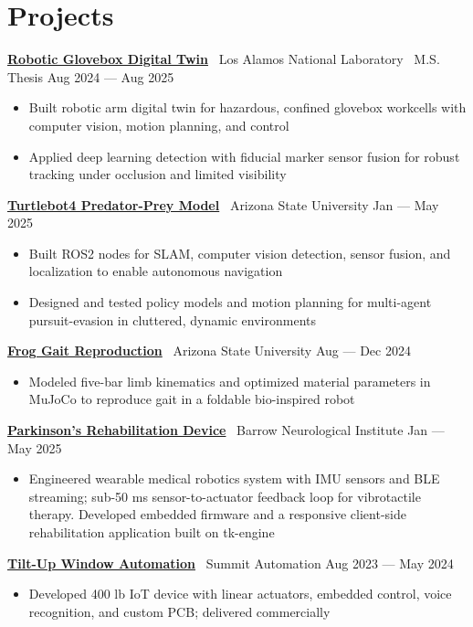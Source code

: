 \documentclass[10pt]{article}
\begin{document}
\section*{Projects}
\textbf{\href{https://github.com/MGross21/glovebox-digitaltwin}{Robotic Glovebox Digital Twin}} \textbar\ Los Alamos National Laboratory \textbar\ M.S. Thesis \hfill Aug 2024 --- Aug 2025
\begin{itemize}
  \item Built robotic arm digital twin for hazardous, confined glovebox workcells with computer vision, motion planning, and control
  \item Applied deep learning detection with fiducial marker sensor fusion for robust tracking under occlusion and limited visibility
\end{itemize}
\textbf{\href{https://ASU-RAS598-2025-S-TEAM02.github.io}{Turtlebot4 Predator-Prey Model}} \textbar\ Arizona State University \hfill Jan --- May 2025
\begin{itemize}
  \item Built ROS2 nodes for SLAM, computer vision detection, sensor fusion, and localization to enable autonomous navigation
  \item Designed and tested policy models and motion planning for multi-agent pursuit-evasion in cluttered, dynamic environments
\end{itemize}
\textbf{\href{https://github.com/MGross21/Robotic-Jumping-Frog}{Frog Gait Reproduction}} \textbar\ Arizona State University \hfill Aug --- Dec 2024
\begin{itemize}
  \item Modeled five-bar limb kinematics and optimized material parameters in MuJoCo to reproduce gait in a foldable bio-inspired robot
\end{itemize}
\textbf{\href{https://github.com/MGross21/syncstride-wearable}{Parkinson's Rehabilitation Device}} \textbar\ Barrow Neurological Institute \hfill Jan --- May 2025
\begin{itemize}
  \item Engineered wearable medical robotics system with IMU sensors and BLE streaming; sub-50 ms sensor-to-actuator feedback loop for vibrotactile therapy. Developed embedded firmware and a responsive client-side rehabilitation application built on tk-engine
\end{itemize}
\textbf{\href{https://www.youtube.com/watch?v=i5I38tLkD6o}{Tilt-Up Window Automation}} \textbar\ Summit Automation \hfill Aug 2023 --- May 2024
\begin{itemize}
  \item Developed 400 lb IoT device with linear actuators, embedded control, voice recognition, and custom PCB; delivered commercially
\end{itemize}
\end{document}
